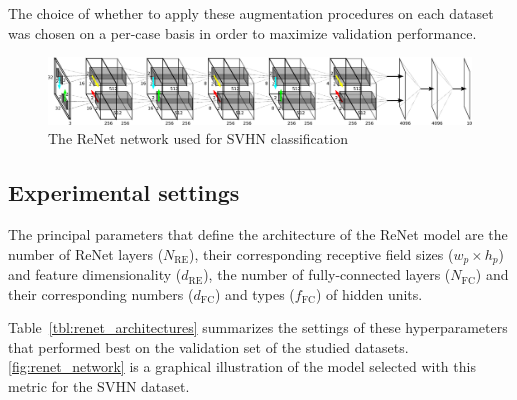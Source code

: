 The choice of whether to apply these augmentation procedures on each dataset
was chosen on a per-case basis in order to maximize validation performance.

\begin{figure}[t]
    \centering
    \includegraphics[height=.14\textheight,width=\columnwidth]{img/renet/renet_svhn.pdf}
    \caption{The ReNet network used for SVHN classification}
    \label{fig:renet_network}
\end{figure}

\subsection{Experimental settings}

The principal parameters that define the architecture of the ReNet model are
the number of ReNet layers ($N_{\text{RE}}$), their corresponding receptive
field sizes ($w_p \times h_p$) and feature dimensionality ($d_{\text{RE}}$),
the number of fully-connected layers ($N_{\text{FC}}$) and their corresponding
numbers ($d_{\text{FC}}$) and types ($f_{\text{FC}}$) of hidden units.

Table~\ref{tbl:renet_architectures} summarizes the settings of these
hyperparameters that performed best on the validation set of the studied
datasets. \autoref{fig:renet_network} is a graphical illustration of the model
selected with this metric for the SVHN dataset.

